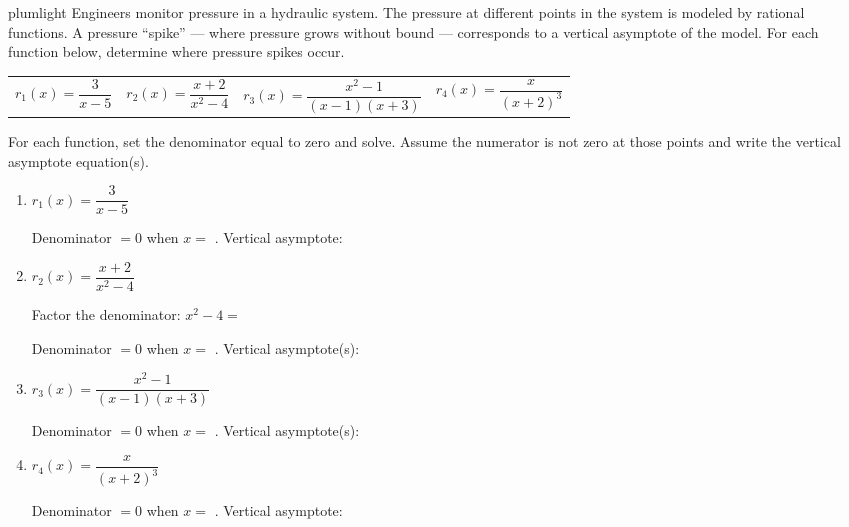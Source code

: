\documentclass[10pt]{article}
\begin{document}
\namepartnerperiod

\vspace{0.1in}

\begin{scenariobox}{plumlight}
\small
Engineers monitor pressure in a hydraulic system. The pressure at different points in the
system is modeled by rational functions. A pressure ``spike'' --- where pressure grows without
bound --- corresponds to a vertical asymptote of the model. For each function below, determine
where pressure spikes occur.

\medskip
\renewcommand{\arraystretch}{1.4}
\begin{tabular}{@{} l l @{\qquad} l l @{}}
$r_1(x) = \dfrac{3}{x - 5}$ &
$r_2(x) = \dfrac{x + 2}{x^2 - 4}$ &
$r_3(x) = \dfrac{x^2 - 1}{(x-1)(x+3)}$ &
$r_4(x) = \dfrac{x}{(x+2)^3}$
\end{tabular}
\end{scenariobox}

\vspace{0.1in}

\begin{tcolorbox}[colback=white, colframe=black!40,
    title=\textbf{Tier R --- Remediate},
    fonttitle=\bfseries, arc=2mm, left=3mm, right=3mm, top=2mm, bottom=2mm]

For each function, set the denominator equal to zero and solve. Assume the numerator is not
zero at those points and write the vertical asymptote equation(s).

\begin{enumerate}[itemsep=10pt]
  \item $r_1(x) = \dfrac{3}{x - 5}$

        Denominator $= 0$ when $x =$ \blank{2cm}. \quad Vertical asymptote: \blank{3cm}

  \item $r_2(x) = \dfrac{x + 2}{x^2 - 4}$

        Factor the denominator: $x^2 - 4 =$ \blank{4cm}

        Denominator $= 0$ when $x =$ \blank{3.5cm}. \quad Vertical asymptote(s): \blank{3.5cm}

  \item $r_3(x) = \dfrac{x^2 - 1}{(x-1)(x+3)}$

        Denominator $= 0$ when $x =$ \blank{3.5cm}. \quad Vertical asymptote(s): \blank{3.5cm}

  \item $r_4(x) = \dfrac{x}{(x+2)^3}$

        Denominator $= 0$ when $x =$ \blank{2cm}. \quad Vertical asymptote: \blank{3cm}
\end{enumerate}
\end{tcolorbox}
\end{document}

